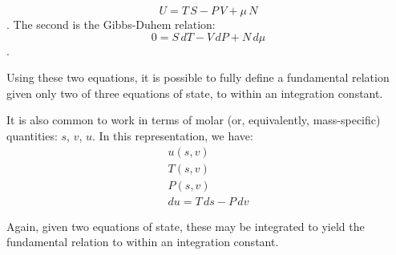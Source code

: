 \documentclass[twocolumn,10pt]{asme2ej}
\begin{document}
\[U = T\,S - P\,V + \mu \,N\].
The second is the Gibbs-Duhem relation:
\[0 = S\,dT - V\,dP + N\,d\mu \].

Using these two equations, it is possible to fully define a fundamental relation given only two of three equations of state, to within an integration constant. 

It is also common to work in terms of molar (or, equivalently, mass-specific) quantities: $s$, $v$, $u$. In this representation, we have: 
\[\begin{array}{c}
u\left( {s,v} \right)\\
T\left( {s,v} \right)\\
P\left( {s,v} \right)\\
du = T\,ds - P\,dv
\end{array}\]

Again, given two equations of state, these may be integrated to yield the fundamental relation to within an integration constant.
\end{document}
